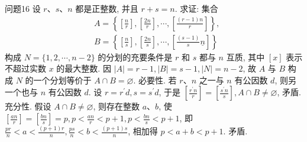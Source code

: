 问题16 设 $r 、 s 、 n$ 都是正整数, 并且 $r+s=n$. 求证: 集合
$$
\begin{aligned}
& A=\left\{\left[\frac{n}{r}\right],\left[\frac{2 n}{r}\right], \cdots,\left[\frac{(r-1) n}{r}\right]\right\}, \\
& B=\left\{\left[\frac{n}{s}\right],\left[\frac{2 n}{s}\right], \cdots,\left[\frac{(s-1)}{s} \underline{n}\right]\right\}
\end{aligned}
$$
构成 $N=\{1,2, \cdots, n-2\}$ 的分划的充要条件是 $r$ 和 $s$ 都与 $n$ 互质, 其中 $[x]$ 表示不超过实数 $x$ 的最大整数.
因 $|A|=r-1,|B|=s-1,|N|=n-2$, 故 $A$ 与 $B$ 构成 $N$ 的一个分划等价于 $A \cap B=\varnothing$.
必要性.
若 $r 、 n$ 之一与 $n$ 有公因数 $d$, 则另一个也与 $n$ 有公因数 $d$. 设 $r= r^{\prime} d, s=s^{\prime} d$, 于是 $\left[\frac{r^{\prime} n}{r}\right]=\left[\frac{s^{\prime} n}{s}\right], A \cap B \neq \varnothing$, 矛盾.
充分性.
假设 $A \cap B \neq \varnothing$, 则存在整数 $a 、 b$, 使 $\left[\frac{a n}{r}\right]=\left[\frac{b n}{s}\right]=p, p< \frac{a n}{r}<p+1, p<\frac{b n}{s}<p+1$, 即 $\frac{p r}{n}<a<\frac{(p+1) r}{n}, \frac{p s}{n}<b<\frac{(p+1) s}{n}$, 相加得 $p<a+b<p+1$. 矛盾.


